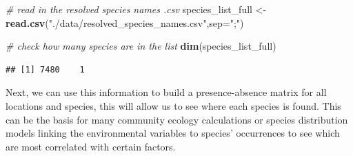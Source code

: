 \documentclass[
]{book}
\newenvironment{Shaded}{\begin{snugshade}}{\end{snugshade}}
\newcommand{\CommentTok}[1]{\textcolor[rgb]{0.56,0.35,0.01}{\textit{#1}}}
\newcommand{\DataTypeTok}[1]{\textcolor[rgb]{0.13,0.29,0.53}{#1}}
\newcommand{\KeywordTok}[1]{\textcolor[rgb]{0.13,0.29,0.53}{\textbf{#1}}}
\newcommand{\NormalTok}[1]{#1}
\newcommand{\StringTok}[1]{\textcolor[rgb]{0.31,0.60,0.02}{#1}}
\begin{document}
\begin{Shaded}
\begin{Highlighting}[]
\CommentTok{# read in the resolved species names .csv}
\NormalTok{species_list_full <-}\StringTok{ }\KeywordTok{read.csv}\NormalTok{(}\StringTok{"./data/resolved_species_names.csv"}\NormalTok{,}\DataTypeTok{sep=}\StringTok{";"}\NormalTok{)}
\end{Highlighting}
\end{Shaded}

\begin{Shaded}
\begin{Highlighting}[]
\CommentTok{# check how many species are in the list}
\KeywordTok{dim}\NormalTok{(species_list_full)}
\end{Highlighting}
\end{Shaded}

\begin{verbatim}
## [1] 7480    1
\end{verbatim}

Next, we can use this information to build a presence-absence matrix for all locations and species, this will allow us to see where each species is found. This can be the basis for many community ecology calculations or species distribution models linking the environmental variables to species' occurrences to see which are most correlated with certain factors.
\end{document}
